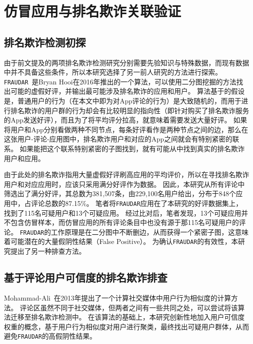 \section{仿冒应用与排名欺诈关联验证}

\subsection{排名欺诈检测初探}

由于前文提及的两项排名欺诈检测研究分别需要先验知识与特殊数据，而现有数据中并不具备这些条件，所以本研究选择了另一前人研究的方法进行探索。
\texttt{FRAUDAR}~\cite{hooi2016fraudar}是Bryan Hooi在2016年推出的一个算法，可以使用二分图挖掘的方法找出可能的虚假好评，并输出最可能涉及排名欺诈的应用和用户。
算法基于的假设是，普通用户的行为（在本文中即为对App评论的行为）是大致随机的，而用于进行排名欺诈的用户群的行为却会有比较明显的指向性（即针对购买了排名欺诈服务的App发送好评），而且为了将平均评分拉高，就意味着需要发送大量好评。
如果将用户和App分别看做两种不同节点，每条好评看作是两种节点之间的边，那么在这张用户-评论-应用图中，排名欺诈用户和对应的App之间就会有特别紧密的联系。
如果能把这个联系特别紧密的子图找到，就有可能从中找到真实的排名欺诈用户和应用。

由于此处的排名欺诈指用大量虚假好评刷高应用的平均评价，所以在寻找排名欺诈用户和对应应用时，应该只采用满分好评作为数据。
因此，本研究从所有评论中筛选出了满分好评，其总数为381,507条，由229,100名用户给出，分布于848个应用中，占评论总数的87.15\%。
笔者将\texttt{FRAUDAR}应用在了本研究的好评数据集上，找到了115名可疑用户和13个可疑应用。
经过比对后，笔者发现，13个可疑应用并不包含仿冒样本，而仿冒应用的所有评论条目中也没有源于那115名可疑用户的评论。
\texttt{FRAUDAR}的工作原理是在二分图中不断删边，从而获得一个紧密子图，这意味着可能潜在的大量假阴性结果（False Positive）。
为确认\texttt{FRAUDAR}的有效性，本研究提出了另一种排查方法。

\subsection{基于评论用户可信度的排名欺诈排查}

Mohammad-Ali~\cite{abbasi2013measuring}在2013年提出了一个计算社交媒体中用户行为相似度的计算方法。
评论区虽然不同于社交媒体，但两者之间有一些共同之处，可以尝试将该算法迁移至排名欺诈检测中。
在该算法的基础上，本研究创新性地加入用户可信度权重的概念，基于用户行为相似度对用户进行聚类，最终找出可疑用户群体，从而避免\texttt{FRAUDAR}的高假阴性结果。

